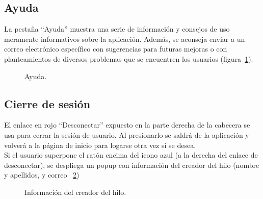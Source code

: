 \documentclass[a4paper, 12pt]{book}
\begin{document}
\subsection{Ayuda}
La pesta\~na ``Ayuda'' muestra una serie de informaci\'on y consejos de uso meramente informativos sobre la aplicaci\'on. Adem\'as, se aconseja enviar a un 
correo electr\'onico espec\'ifico con sugerencias para futuras mejoras o con planteamientos de diversos problemas que se encuentren los usuarios 
(figura~\ref{figura:ayuda}).
\begin{figure}[htbp] 
  \centering
  \caption{Ayuda.}
  \label{figura:ayuda}
\end{figure}


\subsection{Cierre de sesi\'on}
El enlace en rojo ``Desconectar'' expuesto en la parte derecha de la cabecera se usa para cerrar la sesi\'on de usuario. Al presionarlo se saldr\'a de la 
aplicaci\'on y volver\'a a la p\'agina de inicio para logarse otra vez si se desea.\\
Si el usuario superpone el rat\'on encima del icono azul (a la derecha del enlace de desconectar), se despliega un popup con informaci\'on del creador del 
hilo (nombre y apellidos, y correo ~\ref{figura:infocreador})
\begin{figure}[htbp] 
  \centering
  \caption{Informaci\'on del creador del hilo.}
  \label{figura:infocreador}
\end{figure}
\end{document}
